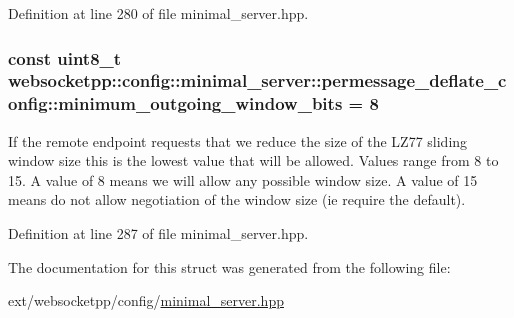 Definition at line 280 of file minimal\+\_\+server.\+hpp.

\hypertarget{structwebsocketpp_1_1config_1_1minimal__server_1_1permessage__deflate__config_a6faed3e781638f77c451d003578d5ca2}{}
\subsubsection[{minimum\+\_\+outgoing\+\_\+window\+\_\+bits}]{\setlength{\rightskip}{0pt plus 5cm}const uint8\+\_\+t websocketpp\+::config\+::minimal\+\_\+server\+::permessage\+\_\+deflate\+\_\+config\+::minimum\+\_\+outgoing\+\_\+window\+\_\+bits = 8\hspace{0.3cm}{\ttfamily [static]}}\label{structwebsocketpp_1_1config_1_1minimal__server_1_1permessage__deflate__config_a6faed3e781638f77c451d003578d5ca2}
If the remote endpoint requests that we reduce the size of the L\+Z77 sliding window size this is the lowest value that will be allowed. Values range from 8 to 15. A value of 8 means we will allow any possible window size. A value of 15 means do not allow negotiation of the window size (ie require the default). 

Definition at line 287 of file minimal\+\_\+server.\+hpp.



The documentation for this struct was generated from the following file\+:\begin{DoxyCompactItemize}
\item 
ext/websocketpp/config/\hyperlink{minimal__server_8hpp}{minimal\+\_\+server.\+hpp}\end{DoxyCompactItemize}
